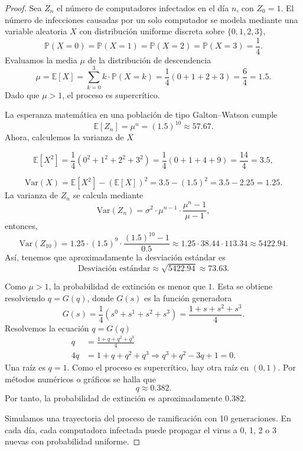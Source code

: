\documentclass{article}
\begin{document}
\begin{proof}
\item[(a)] Sea $Z_n$ el número de computadores infectados en el día $n$, con $Z_0 = 1$. El número de infecciones causadas por un solo computador se modela mediante una variable aleatoria $X$ con distribución uniforme discreta sobre $\{0,1,2,3\}$,
\[
\mathbb{P}(X = 0) = \mathbb{P}(X = 1) = \mathbb{P}(X = 2) = \mathbb{P}(X = 3) = \frac{1}{4}.
\]
Evaluamos la media $\mu$ de la distribución de descendencia
\[
\mu = \mathbb{E}[X] = \sum_{k=0}^{3} k \cdot \mathbb{P}(X = k) = \frac{1}{4}(0 + 1 + 2 + 3) = \frac{6}{4} = 1.5.
\]
Dado que $\mu > 1$, el proceso es supercrítico.

\item[(b)] La esperanza matemática en una población de tipo Galton–Watson cumple
\[
\mathbb{E}[Z_n] = \mu^n = (1.5)^{10} \approx 57.67.
\]
Ahora, calculemos la varianza de $X$

\[
\mathbb{E}[X^2] = \frac{1}{4}(0^2 + 1^2 + 2^2 + 3^2) = \frac{1}{4}(0 + 1 + 4 + 9) = \frac{14}{4} = 3.5,
\]

\[
\text{Var}(X) = \mathbb{E}[X^2] - (\mathbb{E}[X])^2 = 3.5 - (1.5)^2 = 3.5 - 2.25 = 1.25.
\]
La varianza de $Z_n$ se calcula mediante
\[
\text{Var}(Z_n) = \sigma^2 \cdot \mu^{n-1} \cdot \frac{\mu^n - 1}{\mu - 1},
\]
entonces,
\[
\text{Var}(Z_{10}) = 1.25 \cdot (1.5)^9 \cdot \frac{(1.5)^{10} - 1}{0.5} \approx 1.25 \cdot 38.44 \cdot 113.34 \approx 5422.94.
\]
Así, tenemos que aproximadamente la desviación estándar es
\[
\text{Desviación estándar} \approx \sqrt{5422.94} \approx 73.63.
\]

\item[(c)] Como $\mu > 1$, la probabilidad de extinción es menor que $1$. Esta se obtiene resolviendo $q = G(q)$, donde $G(s)$ es la función generadora
\[
G(s) = \frac{1}{4}(s^0 + s^1 + s^2 + s^3) = \frac{1 + s + s^2 + s^3}{4}.
\]
Resolvemos la ecuación $q = G(q)$
\begin{align*}
q &= \frac{1 + q + q^2 + q^3}{4} \\
4q &= 1 + q + q^2 + q^3 \Rightarrow q^3 + q^2 - 3q + 1 = 0.
\end{align*}
Una raíz es $q = 1$. Como el proceso es supercrítico, hay otra raíz en $(0,1)$. Por métodos numéricos o gráficos se halla que
\[
q \approx 0.382.
\]
Por tanto, la probabilidad de extinción es aproximadamente $0.382$.

\item[(d)] Simulamos una trayectoria del proceso de ramificación con 10 generaciones. En cada día, cada computadora infectada puede propagar el virus a 0, 1, 2 o 3 nuevas con probabilidad uniforme.


\end{proof}
\end{document}
